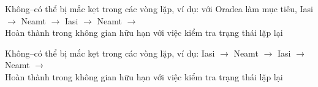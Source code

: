 \documentclass{article}
\begin{document}
\begin{huge}
\vspace*{0.3in}

\textwidth
{}





\vspace*{0.3in}

\textwidth
{}





\vspace*{0.3in}

\textwidth
{}





\vspace*{0.3in}

\textwidth
{}








 Không--có thể bị mắc kẹt trong các vòng lặp, ví dụ: với Oradea làm mục tiêu,\nl
Iasi $\rightarrow$ Neamt $\rightarrow$ Iasi $\rightarrow$ Neamt $\rightarrow$\\
Hoàn thành trong không gian hữu hạn với việc kiểm tra trạng thái lặp lại




 Không--có thể bị mắc kẹt trong các vòng lặp, ví dụ:\nl
Iasi $\rightarrow$ Neamt $\rightarrow$ Iasi $\rightarrow$ Neamt $\rightarrow$\\
Hoàn thành trong không gian hữu hạn với việc kiểm tra trạng thái lặp lại


\end{huge}
\end{document}
